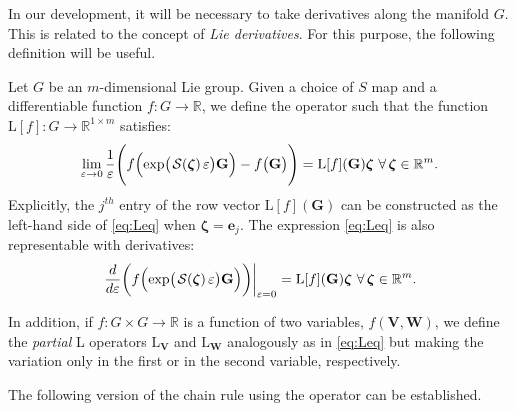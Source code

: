 In our development, it will be necessary to take derivatives along the manifold $G$. This is related to the concept of \emph{Lie derivatives}. For this purpose, the following definition will be useful.
\begin{definition}  \label{def:Loperator} Let $G$ be an $m$-dimensional Lie group. Given a choice of $S$ map and a differentiable function $f: G \to \mathbb{R}$, we define the  operator such that the function $\text{L}[f] : G \to \mathbb{R}^{1 \times m}$ satisfies:
\begin{equation}
\label{eq:Leq}
    \lim_{\varepsilon \rightarrow 0} \frac{1}{\varepsilon} \Biggl( f\Bigl(\exp\bigl(\SL[\boldsymbol{\zeta}]\varepsilon\bigr)\mathbf{G}\Bigr) - f\bigl(\mathbf{G}\bigr) \Biggr) = \text{L}[f](\mathbf{G}) \boldsymbol{\zeta} \ \forall\, \boldsymbol{\zeta} \in \mathbb{R}^m.
\end{equation}
Explicitly, the $j^{th}$ entry of the row vector $\text{L}[f](\mathbf{G})$ can be constructed as the left-hand side of \eqref{eq:Leq} when $\boldsymbol{\zeta} = \mathbf{e}_j$. The expression \eqref{eq:Leq} is also representable with derivatives:
\begin{align}
    \left.\frac{d}{d\varepsilon}\biggl(f\Bigl(\exp\bigl(\SL[\boldsymbol{\zeta}]\varepsilon\bigr)\mathbf{G}\Bigr)\biggr)\right|_{\varepsilon=0} = \text{L}[f](\mathbf{G})\boldsymbol{\zeta}\ \forall\, \boldsymbol{\zeta} \in \mathbb{R}^m.
    \label{eq:L-operator-derivative-form}
\end{align}

In addition, if $f: G \times G \to \mathbb{R}$ is a function of two variables, $f(\mathbf{V},\mathbf{W})$, we define the \emph{partial} L operators $\text{L}_{\mathbf{V}}$ and $\text{L}_{\mathbf{W}}$ analogously as in \eqref{eq:Leq} but making the variation only in the first or in the second variable, respectively. 
\end{definition}

The following version of the chain rule using the  operator can be established.

